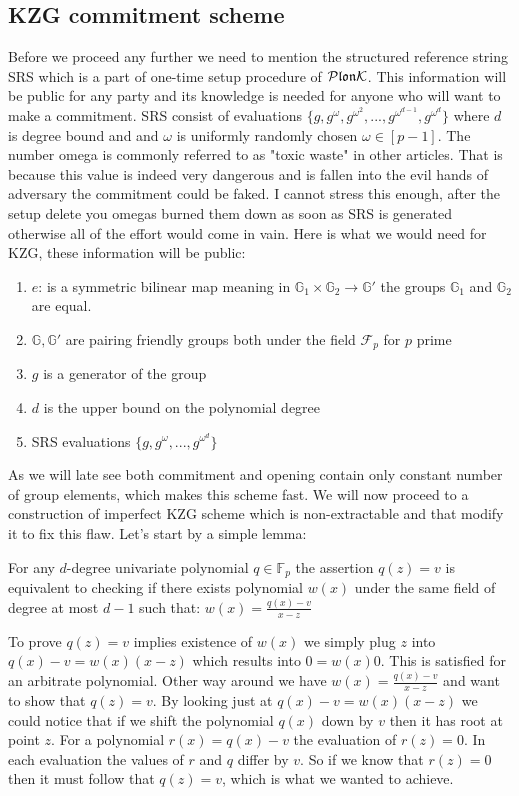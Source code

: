 \subsection{KZG commitment scheme}
Before we proceed any further we need to mention the structured reference string SRS which is a part of one-time setup procedure of $\mathcal{P}\mathfrak{lon}\mathcal{K}$. This information will be public for any party and its knowledge is needed for anyone who will want to make a commitment. SRS consist of evaluations $\{g, g^{\omega}, g^{\omega^2}, ..., g^{\omega^{d-1}}, g^{\omega^{d}}\}$ where $d$ is degree bound and and $\omega$ is uniformly randomly chosen $\omega \in [p-1]$. The number omega is commonly referred to as "toxic waste" in other articles. That is because this value is indeed very dangerous and is fallen into the evil hands of adversary the commitment could be faked. I cannot stress this enough, after the setup delete you omegas burned them down as soon as SRS is generated otherwise all of the effort would come in vain. Here is what we would need for KZG, these information will be public:
\begin{enumerate}
    \item $e$: is a symmetric bilinear map meaning in $\mathbb{G}_1 \times \mathbb{G}_2 \rightarrow \mathbb{G}'$ the groups $\mathbb{G}_1$ and $\mathbb{G}_2$ are equal.
    \item $\mathbb{G}, \mathbb{G}'$ are pairing friendly groups both under the field  $\mathcal{F}_p$ for $p$ prime
    \item $g$ is a generator of the group
    \item $d$ is the upper bound on the polynomial degree
    \item SRS evaluations $\{g, g^{\omega}, ... ,g^{\omega^d}\}$
\end{enumerate}

As we will late see both commitment and opening contain only constant number of group elements, which makes this scheme fast. We will now proceed to a construction of imperfect KZG scheme which is non-extractable and that modify it to fix this flaw. Let's start by a simple lemma:

\begin{lemma}
    For any $d$-degree univariate polynomial $q \in \mathbb{F}_p$ the assertion $q(z) = v$ is equivalent to checking if there exists polynomial $w(x)$ under the same field of degree at most $d - 1$ such that: $w(x) = \frac{q(x)-v}{x-z}$
\end{lemma}

\begin{dukaz}
    To prove $q(z) = v$ implies existence of $w(x)$ we simply plug $z$ into $q(x)-v = w(x)(x-z)$ which results into $0 = w(x)0$. This is satisfied for an arbitrate polynomial. Other way around we have $w(x) = \frac{q(x) -v}{x-z}$ and want to show that $q(z) = v$. By looking just at $q(x)-v = w(x)(x-z)$ we could notice that if we shift the polynomial $q(x)$ down by $v$ then it has root at point $z$. For a polynomial $r(x) = q(x) - v$ the evaluation of $r(z) = 0$. In each evaluation the values of $r$ and $q$ differ by $v$. So if we know that $r(z) = 0$ then it must follow that $q(z) = v$, which is what we wanted to achieve.
\end{dukaz}

